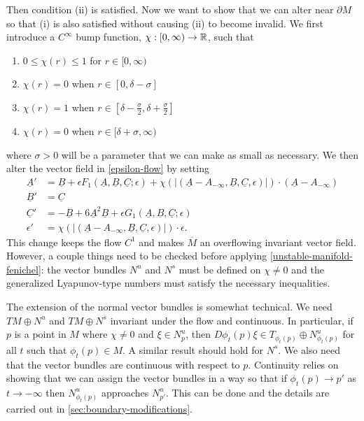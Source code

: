 Then condition (ii) is satisfied. Now we want to show that we can alter near \(\partial M\) so that (i) is also satisfied without causing (ii) to become invalid. We first introduce a \(C^\infty\) bump function, \(\chi:[0, \infty) \to \mathbb{R}\), such that 
\begin{enumerate}[label = (\arabic*)]
	\item \(0\leq \chi(r) \leq 1\) for \(r \in[0,\infty)\)
	\item \(\chi(r) = 0\) when \(r\in [0, \delta -\sigma]\)
	\item \(\chi(r) = 1\) when \(r\in [\delta - \frac \sigma 2 , \delta + \frac \sigma 2]\)
	\item \(\chi(r) = 0\) when \(r\in [\delta +\sigma,\infty)\)
\end{enumerate}
where \(\sigma > 0\) will be a parameter that we can make as small as necessary. We then alter the vector field in \cref{epsilon-flow} by setting
\begin{equation}\label{perturbed-vector-field}
\begin{aligned}
	\underline A ' &= \underline B + \epsilon F_1(\underline A, \underline B, \underline C;\epsilon) + \chi( |(\underline A - A_{-\infty}, \underline B, \underline C, \epsilon)|) \cdot (\underline A - A_{-\infty}) \\
	\underline B' &= \underline C \\
	\underline C ' &= - \underline B + 6 \underline A^2 \underline B + \epsilon G_1(\underline A, \underline B, \underline C;\epsilon) \\
	\epsilon' &= \chi( |(\underline A - A_{-\infty}, \underline B, \underline C, \epsilon)|) \cdot \epsilon.
\end{aligned}
\end{equation}
This change keeps the flow \(C^1\) and makes \(\overline M\) an overflowing invariant vector field. However, a couple things need to be checked before applying \cref{unstable-manifold-fenichel}: the vector bundles \(N^u\) and \(N^s\) must be defined on \(\chi \neq 0\) and the generalized Lyapunov-type numbers must satisfy the necessary inequalities.

The extension of the normal vector bundles is somewhat technical. We need \(T M \oplus N^u\) and \(TM \oplus N^s\) invariant under the flow and continuous. In particular, if \(p\) is a point in \(M\) where \(\chi \neq 0\) and \(\xi \in N^u_p\), then \(D\phi_t(p) \xi \in T_{\phi_t(p)} \oplus N^u_{\phi_t(p)}\) for all \(t\) such that \(\phi_t(p) \in M\). A similar result should hold for \(N^s\). We also need that the vector bundles are continuous with respect to \(p\). Continuity relies on showing that we can assign the vector bundles in a way so that if \(\phi_t(p) \to p'\) as \(t\to-\infty\) then \(N^u_{\phi_t(p)}\) approaches \(N^u_{p'}\). This can be done and the details are carried out in \cref{sec:boundary-modifications}.

